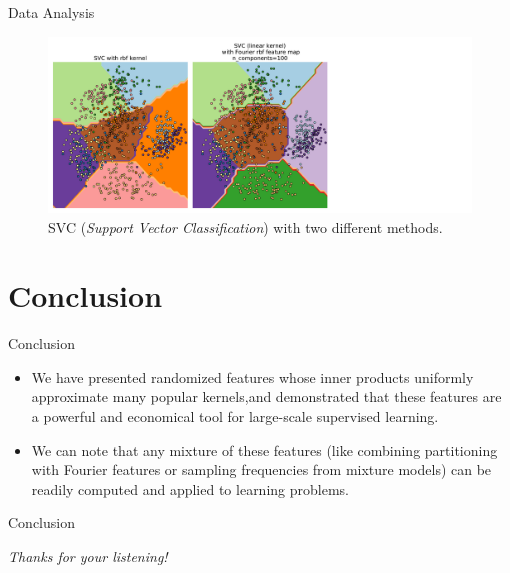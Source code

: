 \documentclass[unknownkeysallowed]{beamer}
\begin{document}
\begin{frame}{Data Analysis}

\begin{figure}[h!]
    \centering
    \includegraphics[scale=0.35]{images/frontiere.pdf}
    \caption{SVC (\textit{Support Vector Classification}) with two different methods.}
    \label{frontiere}
\end{figure}

\end{frame}


\section{Conclusion}
\label{sec:Conclusion}

\begin{frame}{Conclusion}
\begin{itemize}
    \item We have presented randomized features whose inner products uniformly approximate many popular kernels,and demonstrated that these features are a powerful and economical tool for large-scale supervised learning.
    \vspace{0.5cm}
    \item We can note that any mixture of these features (like combining partitioning with Fourier features or sampling frequencies from mixture models) can be readily computed and applied to learning problems.
\end{itemize}
\end{frame}


\begin{frame}{Conclusion}
\begin{center}
    \huge{\textit{Thanks for your listening!}}
\end{center}
\end{frame}
\end{document}

